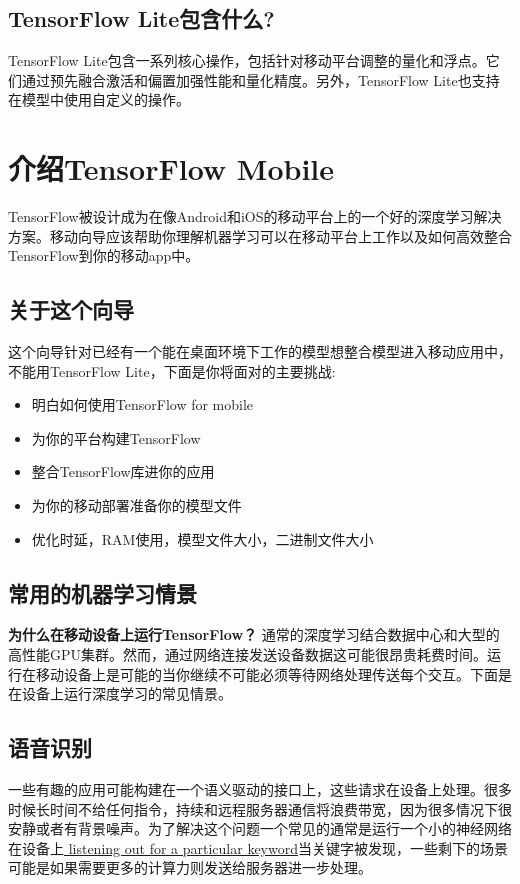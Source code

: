 \subsection{TensorFlow Lite包含什么?}
TensorFlow Lite包含一系列核心操作，包括针对移动平台调整的量化和浮点。它们通过预先融合激活和偏置加强性能和量化精度。另外，TensorFlow Lite也支持在模型中使用自定义的操作。
\section{介绍TensorFlow Mobile}
TensorFlow被设计成为在像Android和iOS的移动平台上的一个好的深度学习解决方案。移动向导应该帮助你理解机器学习可以在移动平台上工作以及如何高效整合TensorFlow到你的移动app中。
\subsection{关于这个向导}
这个向导针对已经有一个能在桌面环境下工作的模型想整合模型进入移动应用中，不能用TensorFlow Lite，下面是你将面对的主要挑战:
\begin{itemize}
    \item 明白如何使用TensorFlow for mobile 
    \item 为你的平台构建TensorFlow
    \item 整合TensorFlow库进你的应用
    \item 为你的移动部署准备你的模型文件
    \item 优化时延，RAM使用，模型文件大小，二进制文件大小
\end{itemize}
\subsection{常用的机器学习情景}
\textbf{为什么在移动设备上运行TensorFlow？}
通常的深度学习结合数据中心和大型的高性能GPU集群。然而，通过网络连接发送设备数据这可能很昂贵耗费时间。运行在移动设备上是可能的当你继续不可能必须等待网络处理传送每个交互。下面是在设备上运行深度学习的常见情景。
\subsection{语音识别}
一些有趣的应用可能构建在一个语义驱动的接口上，这些请求在设备上处理。很多时候长时间不给任何指令，持续和远程服务器通信将浪费带宽，因为很多情况下很安静或者有背景噪声。为了解决这个问题一个常见的通常是运行一个小的神经网络在设备上\href{https://www.tensorflow.org/tutorials/audio_recognition?hl=zh-cn}{ listening out for a particular keyword}当关键字被发现，一些剩下的场景可能是如果需要更多的计算力则发送给服务器进一步处理。
